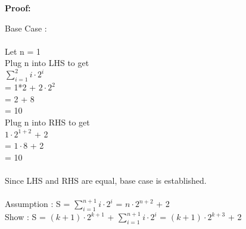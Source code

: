 \documentclass[12pt]{article}
\begin{document}
\par
\bigskip
{\bf Proof:}
\par
Base Case : \\
\\
	Let n = 1 \\
	Plug n into LHS to get \\
	$\sum\limits_{i=1}^{2} i\cdot 2^{i}$  \\
	= 1*2 + $2\cdot2^{2}$ \\
	= 2 + 8 \\
	= 10 \\
	Plug n into RHS to get \\
	$1\cdot 2^{1 + 2}$ + 2 \\
	= $1\cdot8$ + 2\\
	= 10 \\
	\\
Since LHS and RHS are equal, base case is established. \\
\\

Assumption :  S = $\sum\limits_{i=1}^{n+1} i\cdot 2^{i}$ = $n\cdot 2^{n + 2}$ + 2 \\
Show :  S = $(k + 1)\cdot 2^{k + 1}$ + $\sum\limits_{i=1}^{n+1} i\cdot 2^{i}$ = $(k + 1)\cdot 2^{k + 3}$ + 2 \\
\end{document}
